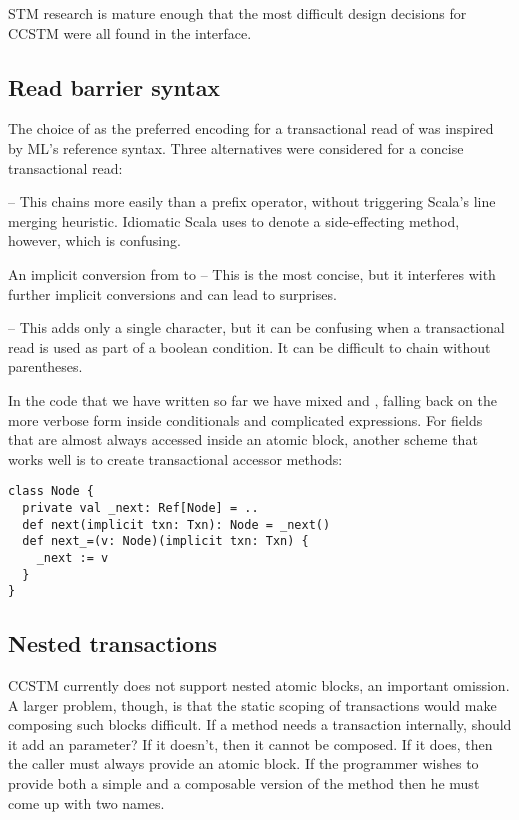 
STM research is mature enough that the most difficult design decisions
for CCSTM were all found in the interface.

\subsection{Read barrier syntax}
\label{sec:syntax}

The choice of  as the preferred encoding for a transactional
read of  was inspired by ML's reference syntax.  Three alternatives
were considered for a concise transactional read:
\begin{packed_enum}
\item {} -- This chains more easily than a prefix operator, without
triggering Scala's line merging heuristic.  Idiomatic Scala uses \code{()} to
denote a side-effecting method, however, which is confusing.
\item An implicit conversion from  to  -- This is
the most concise, but it interferes with further implicit conversions and
can lead to surprises.
\item {} -- This adds only a single character, but it can be
confusing when a transactional read is used as part of a boolean condition.
It can be difficult to chain without parentheses.
\end{packed_enum}

In the code that we have written so far we have mixed  and
, falling back on the more verbose form inside conditionals and
complicated expressions.  For fields that are almost always accessed inside
an atomic block, another scheme that works well is to create transactional
accessor methods:
\lstset{numbers=none}
\begin{lstlisting}
class Node {
  private val _next: Ref[Node] = ..
  def next(implicit txn: Txn): Node = _next()
  def next_=(v: Node)(implicit txn: Txn) {
    _next := v
  }
}
\end{lstlisting}
\lstset{numbers=left}

\subsection{Nested transactions}

CCSTM currently does not support nested atomic blocks, an important
omission.  A larger problem, though, is that the static scoping
of transactions would make composing such blocks difficult.  If a
method  needs a transaction internally, should it add an
  parameter?  If it doesn't, then it
cannot be composed.  If it does, then the caller must always provide
an atomic block.  If the programmer wishes to provide both a simple
and a composable version of the method then he must come up with
two names.

